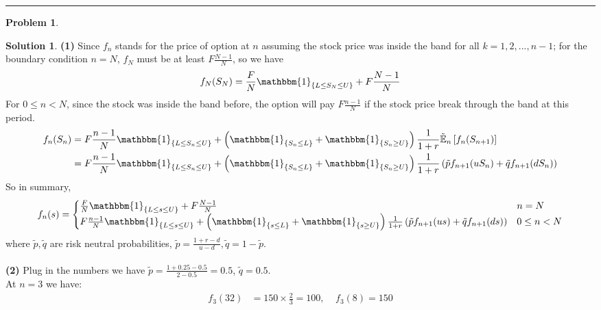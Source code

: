 \documentclass[a4paper, 10pt]{article}
\theoremstyle{definition}
\newtheorem{problem}{Problem}
\theoremstyle{hSol}
\newtheorem*{solution}{Solution}
\begin{document}
\noindent\rule{16cm}{0.4pt}
\begin{problem}
\end{problem}
\begin{solution} \textbf{(1)} Since $f_n$ stands for the price of option at $n$ assuming the stock price was inside the band for all $k=1,2,...,n-1$; for the boundary condition $n=N$, $f_N$ must be at least $F\frac{N-1}{N}$, so we have
\begin{equation}
  f_N(S_N) = \frac{F}{N} \mathbbm{1}_{\{L\leq S_N \leq U\}} + F\frac{N-1}{N}
\end{equation}
For $0\leq n<N$, since the stock was inside the band before, the option will pay $F\frac{n-1}{N}$ if the stock price break through the band at this period.
\begin{equation}
  \begin{split}
    f_n(S_n) &= F\frac{n-1}{N} \mathbbm{1}_{\{L\leq S_n \leq U\}} + \left(\mathbbm{1}_{\{S_n \leq L\}} + \mathbbm{1}_{\{S_n \geq U\}}\right) \frac{1}{1+r} \tilde{\mathbb{E}}_n\left[f_n(S_{n+1})\right] \\
    &=F\frac{n-1}{N} \mathbbm{1}_{\{L\leq S_n \leq U\}} + \left(\mathbbm{1}_{\{S_n \leq L\}} + \mathbbm{1}_{\{S_n \geq U\}}\right) \frac{1}{1+r} \left(\tilde{p}f_{n+1}(uS_n)+\tilde{q}f_{n+1}(dS_n)\right)
  \end{split}
\end{equation}
So in summary,
\begin{equation}
  f_n(s) = \begin{cases}
    \frac{F}{N} \mathbbm{1}_{\{L\leq s \leq U\}} + F\frac{N-1}{N} & n=N\\
    F\frac{n-1}{N} \mathbbm{1}_{\{L\leq s \leq U\}} + \left(\mathbbm{1}_{\{s \leq L\}} + \mathbbm{1}_{\{s \geq U\}}\right) \frac{1}{1+r} \left(\tilde{p}f_{n+1}(us)+\tilde{q}f_{n+1}(ds)\right) & 0\leq n< N
  \end{cases}
\end{equation}
where $\tilde{p}, \tilde{q}$ are risk neutral probabilities, $\tilde{p}=\frac{1+r-d}{u-d}, \tilde{q}=1- \tilde{p}$. \\
~\\
\textbf{(2)} Plug in the numbers we have $\tilde{p}=\frac{1+0.25-0.5}{2-0.5}=0.5$, $\tilde{q}=0.5$.\\
At $n=3$ we have:
\begin{equation}
  \begin{split}
    f_3(32) &= 150\times \frac{2}{3} = 100,~~~~~f_3(8) = 150 \\

\end{split}
\end{equation}
\end{solution}
\end{document}
